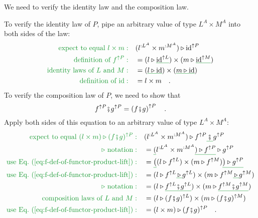 We need to verify the identity law and the composition law.

To verify the identity law of $P$, pipe an arbitrary value of type
$L^{A}\times M^{A}$ into both sides of the law:
\begin{align*}
{\color{greenunder}\text{expect to equal }l\times m:}\quad & (l^{:L^{A}}\times m^{:M^{A}})\triangleright\text{id}^{\uparrow P}\\
{\color{greenunder}\text{definition of }f^{\uparrow P}:}\quad & =(l\triangleright\gunderline{\text{id}^{\uparrow L}})\times(m\triangleright\gunderline{\text{id}^{\uparrow M}})\\
{\color{greenunder}\text{identity laws of }L\text{ and }M:}\quad & =(\gunderline{l\triangleright\text{id}})\times(\gunderline{m\triangleright\text{id}})\\
{\color{greenunder}\text{definition of }\text{id}:}\quad & =l\times m\quad.
\end{align*}
To verify the composition law of $P$, we need to show that
\[
f^{\uparrow P}\bef g^{\uparrow P}=\left(f\bef g\right)^{\uparrow P}\quad.
\]
Apply both sides of this equation to an arbitrary value of type $L^{A}\times M^{A}$:
\begin{align*}
{\color{greenunder}\text{expect to equal }(l\times m)\triangleright(f\bef g)^{\uparrow P}:}\quad & (l^{:L^{A}}\times m^{:M^{A}})\triangleright f^{\uparrow P}\gunderline{\,\bef\,}g^{\uparrow P}\\
{\color{greenunder}\triangleright\text{ notation}:}\quad & =\gunderline (l^{:L^{A}}\times m^{:M^{A}}\gunderline{)\triangleright f^{\uparrow P}}\triangleright g^{\uparrow P}\\
{\color{greenunder}\text{use Eq.~(\ref{eq:f-def-of-functor-product-lift})}:}\quad & =\gunderline{\big(}(l\triangleright f^{\uparrow L})\times(m\triangleright f^{\uparrow M})\gunderline{\big)\triangleright g^{\uparrow P}}\\
{\color{greenunder}\text{use Eq.~(\ref{eq:f-def-of-functor-product-lift})}:}\quad & =(l\triangleright f^{\uparrow L}\gunderline{\,\triangleright\,}g^{\uparrow L})\times(m\triangleright f^{\uparrow M}\gunderline{\,\triangleright\,}g^{\uparrow M})\\
{\color{greenunder}\triangleright\text{ notation}:}\quad & =(l\triangleright\gunderline{f^{\uparrow L}\bef g^{\uparrow L}})\times(m\triangleright\gunderline{f^{\uparrow M}\bef g^{\uparrow M}})\\
{\color{greenunder}\text{composition laws of }L\text{ and }M:}\quad & =(l\triangleright(f\bef g)^{\uparrow L})\times(m\triangleright(f\bef g)^{\uparrow M})\\
{\color{greenunder}\text{use Eq.~(\ref{eq:f-def-of-functor-product-lift})}:}\quad & =(l\times m)\triangleright(f\bef g)^{\uparrow P}\quad.
\end{align*}
